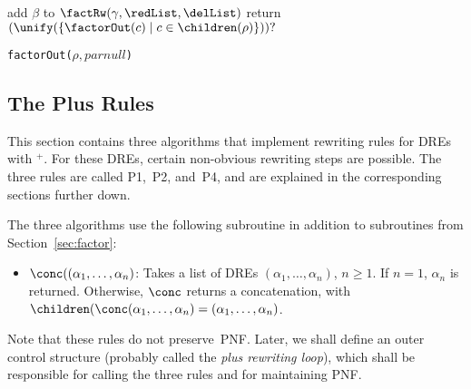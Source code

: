 \documentclass[a4paper,11pt, svgnames,titlepage]{article}
\newcommand{\rxp}{{^\mathtt{+}}}
\newcommand{\rxo}{\mathtt{?}}
\DeclareMathOperator{\eqModEw}{=_{\emptyword}}
\newcommand{\emptyword}{\varepsilon}
\begin{document}
\begin{algorithm2e}[H]
{{{				
				{
					\lIf{$L(\unify(F))\eqModEw L(p_\gamma)$}{$\delList\leftarrow F$}
				}
				{
					\lIf{$L(\unify(F))\eqModEw L(p_\gamma)$}{$\delList\leftarrow F$} %
				}
				\Else
				{
				}
				\ForEach{$\beta\in(\children(\rho)\setminus(\{\gamma\}\cup\delList))$}
				{
					{add $\beta$ to \redList}
				}
				\If{$(\redList\cup\delList)\neq \emptyset$}
				{
					$\factRw(\gamma,\redList,\delList)$\;
				}
			}
		}
		{
			return $(\unify(\{\factorOut(c)\mid c\in\children(\rho)\}))\rxo$\;
		}
	}
	\caption{\texttt{factorOut(}$\rho,parnull$\texttt{)}}
\end{algorithm2e}
\subsection{The Plus Rules}\label{sec:prules}
This section contains three algorithms that implement rewriting rules for DREs with $\rxp$. For these DREs, certain non-obvious rewriting steps are possible. The three rules are called P1,~P2, and~P4, and are explained in the corresponding sections further down.

The three algorithms use the following subroutine in addition to subroutines from Section~\ref{sec:factor}:
\begin{itemize}
	\item $\conc((\alpha_1,\ldots,\alpha_n)$: Takes a list of DREs $(\alpha_1,\ldots,\alpha_n)$, $n\geq 1$. If $n=1$, $\alpha_n$ is returned. Otherwise, $\conc$ returns a concatenation, with $\children(\conc(\alpha_1,\ldots,\alpha_n)=(\alpha_1,\ldots,\alpha_n)$.
\end{itemize}

Note that these rules do not preserve~PNF. Later, we shall define an outer control structure (probably called the \emph{plus rewriting loop}), which shall be responsible for calling the three rules and for maintaining PNF.
\end{document}
